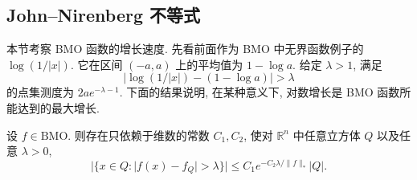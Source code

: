 \subsection{John--Nirenberg 不等式}
\label{sec:ch6-john-nirenberg}

本节考察 BMO 函数的增长速度. 先看前面作为 BMO 中无界函数例子的 $\log(1/|x|)$. 它在区间 $(-a,a)$ 上的平均值为 $1-\log a$. 给定 $\lambda>1$, 满足
\[
 |\log(1/|x|)-(1-\log a)|>\lambda
\]
的点集测度为 $2ae^{-\lambda-1}$. 下面的结果说明, 在某种意义下, 对数增长是 BMO 函数所能达到的最大增长.

\begin{Theorem}
\label{thm:ch6-john-nirenberg}
设 $f\in\mathrm{BMO}$. 则存在只依赖于维数的常数 $C_1,C_2$, 使对 $\mathbb R^n$ 中任意立方体 $Q$ 以及任意 $\lambda>0$,
\begin{equation}
\label{eq:ch6-john-nirenberg}
 |\{x\in Q:|f(x)-f_Q|>\lambda\}|
 \le C_1e^{-C_2\lambda/\|f\|_*}|Q|.
\end{equation}
\end{Theorem}

